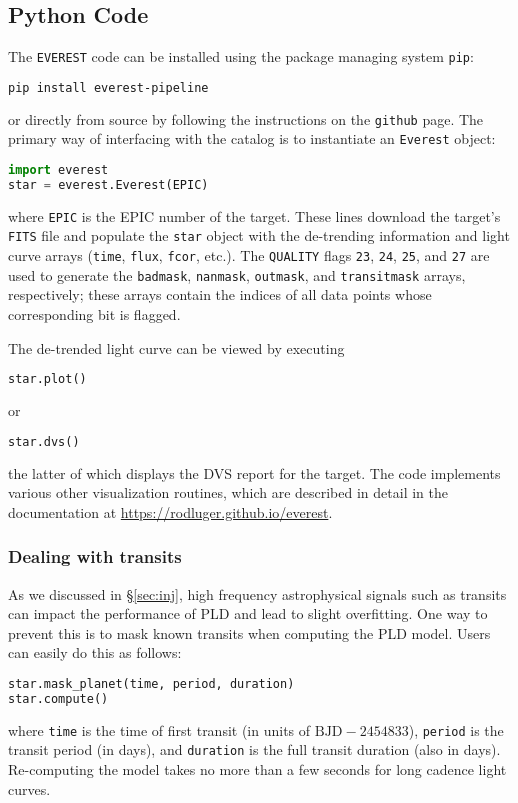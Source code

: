 \documentclass[]{emulateapj}
\newenvironment{edits}{\color{red}}{\color{black}}
\begin{document}
\begin{edits}
\subsection{Python Code}
\label{sec:python}
The \texttt{EVEREST} code can be installed using the package managing system \texttt{pip}:
%
\begin{lstlisting}[language=bash]
pip install everest-pipeline
\end{lstlisting}
%
or directly from source by following the instructions on the \texttt{github} page.
The primary way of interfacing
with the catalog is to instantiate an \texttt{Everest} object:
%
\begin{lstlisting}[language=Python]
import everest
star = everest.Everest(EPIC)
\end{lstlisting}
%
where \texttt{EPIC} is the EPIC number of the target. These lines download the
target's \texttt{FITS} file and populate
the \texttt{star} object with the de-trending information and light curve arrays
(\texttt{time}, \texttt{flux}, \texttt{fcor}, etc.).
The \texttt{QUALITY} flags \texttt{23}, \texttt{24}, \texttt{25}, and \texttt{27} are
used to generate the \texttt{badmask}, \texttt{nanmask}, \texttt{outmask}, and
\texttt{transitmask} arrays, respectively; these arrays contain the indices of all
data points whose corresponding bit is flagged.

The de-trended light curve can be viewed by executing
%
\begin{lstlisting}[language=Python]
star.plot()
\end{lstlisting}
%
or
%
\begin{lstlisting}[language=Python]
star.dvs()
\end{lstlisting}
%
the latter of which displays the DVS report for the target.
The code implements various other visualization routines, which are described in
detail in the documentation at \url{https://rodluger.github.io/everest}.

\subsubsection{Dealing with transits}
\label{sec:dealing_with_transits}
As we discussed in \S\ref{sec:inj}, high frequency astrophysical signals such
as transits can impact the performance of PLD and lead to slight overfitting.
One way to prevent this is to mask known transits when computing the PLD
model. Users can easily do this as follows:
%
\begin{lstlisting}[language=Python]
star.mask_planet(time, period, duration)
star.compute()
\end{lstlisting}
%
where \texttt{time} is the time of first transit (in units of $\mathrm{BJD} - 2454833$),
\texttt{period} is the transit period (in days), and \texttt{duration} is the full
transit duration (also in days). Re-computing the model takes no more than
a few seconds for long cadence light curves.


\end{edits}
\end{document}
